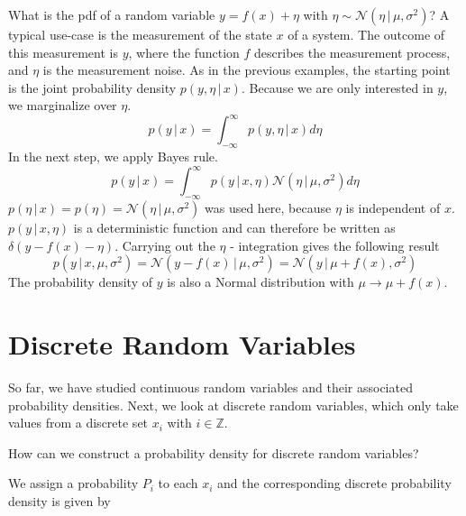 \documentclass{tstextbook}
\begin{document}
\begin{example}
What is the pdf of a random variable $y = f(x) + \eta$ with 
$\eta\sim \mathcal{N}\left(\eta\,\vert\,\mu,\sigma^2\right)$?
A typical use-case is the measurement of the state $x$ of a system. The outcome of this measurement is $y$, where the function $f$ describes the measurement process, and $\eta$ is the measurement noise. As in the previous examples, the starting point is the joint probability density $p(y,\eta\,\vert\, x)$. Because we are only interested in $y$, we marginalize over $\eta$.   \begin{equation}
    p(y\,\vert\,x)=\int_{-\infty}^{\infty}p(y,\eta\,\vert\,x)d\eta
  \end{equation}
In the next step, we apply Bayes rule.
  \begin{equation}
    p(y\,\vert\,x)=\int_{-\infty}^{\infty}p(y\,\vert\,x,\eta)\mathcal{N}\left(\eta\,\vert\,\mu,\sigma^2\right)d\eta
  \end{equation}
$p(\eta\,\vert\,x)=p(\eta)=\mathcal{N}\left(\eta\,\vert\,\mu,\sigma^2\right)$ was used here, because $\eta$ is independent of $x$.
$p(y\,\vert\,x,\eta)$ is a deterministic function and can therefore be written as $\delta\left(y-f(x)-\eta\right)$. Carrying out the $\eta$ - integration gives the following result
  \begin{equation}
    p\left(y\,\vert\,x,\mu,\sigma^2\right)=\mathcal{N}\left(y-f(x)\,\vert\,\mu,\sigma^2\right)=\mathcal{N}\left(y\,\vert\,\mu+f(x),\sigma^2\right)
  \end{equation}
The probability density of $y$ is also a Normal distribution with $\mu\rightarrow\mu+f(x)$. 
\end{example}
\section{Discrete Random Variables}
So far, we have studied continuous random variables and their associated probability densities. Next, we look at discrete random variables, which only take values from a discrete set $x_i$ with $i\in \mathbb{Z}$.

How can we construct a probability density for discrete random variables?

We assign a probability $P_i$ to each $x_i$ and the corresponding discrete probability density is given by
\end{document}
